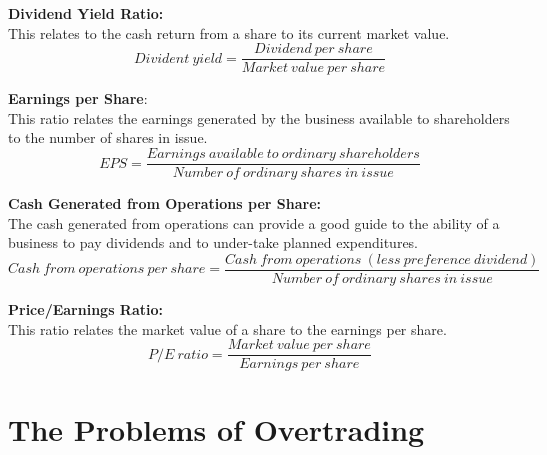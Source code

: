 \documentclass{report}
\newenvironment{blackbox}[1][Black]
  {\begin{tcolorbox}[colframe=#1,colback=white]}
  {\end{tcolorbox}}
\begin{document}
\begin{blackbox}
    \textbf{Dividend Yield Ratio:}\\
    This relates to the cash return from a share to its current market value.
    \begin{equation}
        Divident \: yield = \frac{Dividend \: per \: share}{Market \: value \: per \: share}
    \end{equation}
\end{blackbox}

\begin{blackbox}
    \textbf{Earnings per Share}:\\
    This ratio relates the earnings generated by the business available to shareholders to the number of shares in issue. 
    \begin{equation}
        EPS = \frac{Earnings \: available \: to \: ordinary \: shareholders}{Number \: of \: ordinary \: shares \: in \: issue}
    \end{equation}
\end{blackbox}

\begin{blackbox}
    \textbf{Cash Generated from Operations per Share:}\\
    The cash generated from operations can provide a good guide to the ability of a business to pay dividends and to under-take planned expenditures.
    \begin{equation}
        Cash \: from \: operations \: per \: share = \frac{Cash \: from \: operations \: (less \: preference \: dividend)}{Number \: of \: ordinary \: shares \: in \: issue}
    \end{equation}
\end{blackbox}

\begin{blackbox}
    \textbf{Price/Earnings Ratio:}\\
    This ratio relates the market value of a share to the earnings per share.
    \begin{equation}
        P/E \: ratio = \frac{Market \: value \: per \: share}{Earnings \: per \: share}
    \end{equation}
\end{blackbox}

\section{The Problems of Overtrading}
\end{document}
